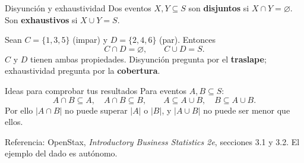 \documentclass[aspectratio=169,11pt,spanish]{beamer}
\begin{document}
\begin{frame}{Disyunción y exhaustividad}
Dos eventos $X,Y\subseteq S$ son \textbf{disjuntos} si $X\cap Y=\varnothing$.
Son \textbf{exhaustivos} si $X\cup Y=S$.

\medskip
Sean $C=\{1,3,5\}$ (impar) y $D=\{2,4,6\}$ (par). Entonces
\[
C\cap D=\varnothing,\qquad C\cup D=S.
\]
$C$ y $D$ tienen ambas propiedades. Disyunción pregunta por el \textbf{traslape}; exhaustividad pregunta por la \textbf{cobertura}.
\end{frame}
\begin{frame}{Ideas para comprobar tus resultados}
Para eventos $A,B\subseteq S$:
\[
A\cap B\subseteq A,\quad A\cap B\subseteq B,\qquad
A\subseteq A\cup B,\quad B\subseteq A\cup B.
\]
Por ello $|A\cap B|$ no puede superar $|A|$ o $|B|$, y $|A\cup B|$ no puede ser menor que ellos.

\medskip
\scriptsize Referencia: OpenStax, \emph{Introductory Business Statistics 2e}, secciones 3.1 y 3.2. El ejemplo del dado es autónomo.
\end{frame}
\end{document}
